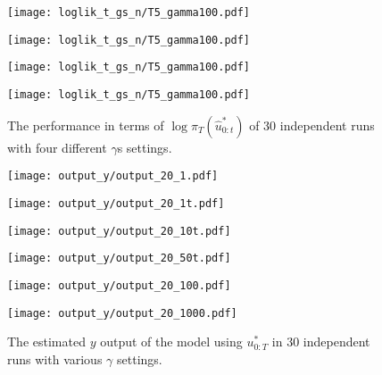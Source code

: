 \begin{figure}[!htbp]
    \centering
    \begin{minipage}{.5\textwidth}
        \centering
        \texttt{[image: loglik\_t\_gs\_n/T5\_gamma100.pdf]}
    \end{minipage}%
    \begin{minipage}{0.5\textwidth}
        \centering
        \texttt{[image: loglik\_t\_gs\_n/T5\_gamma100.pdf]}
    \end{minipage}
    \begin{minipage}{0.5\textwidth}
        \centering
        \texttt{[image: loglik\_t\_gs\_n/T5\_gamma100.pdf]}
    \end{minipage}%
    \begin{minipage}{0.5\textwidth}
        \centering
        \texttt{[image: loglik\_t\_gs\_n/T5\_gamma100.pdf]}
    \end{minipage}
    \caption{The performance in terms of $\log\pi_T(\hat{u}^*_{0:t})$ of 30 independent runs with four different $\gamma$s settings.}
    \label{fig:log}
\end{figure}

\begin{figure}[!htbp]
    \centering
    \begin{minipage}{.5\textwidth}
        \centering
        \texttt{[image: output\_y/output\_20\_1.pdf]}
        \caption*{$\gamma=1$}
    \end{minipage}%
    \begin{minipage}{0.5\textwidth}
        \centering
        \texttt{[image: output\_y/output\_20\_1t.pdf]}
        \caption*{$\gamma=1t$}
    \end{minipage}
    \begin{minipage}{0.5\textwidth}
        \centering
        \texttt{[image: output\_y/output\_20\_10t.pdf]}
        \caption*{$\gamma=10t$}
    \end{minipage}%
    \begin{minipage}{0.5\textwidth}
        \centering
        \texttt{[image: output\_y/output\_20\_50t.pdf]}
        \caption*{$\gamma=50t$}
    \end{minipage}
    \begin{minipage}{0.5\textwidth}
        \centering
        \texttt{[image: output\_y/output\_20\_100.pdf]}
        \caption*{$\gamma=100$}
    \end{minipage}%
    \begin{minipage}{0.5\textwidth}
        \centering
        \texttt{[image: output\_y/output\_20\_1000.pdf]}
        \caption*{$\gamma=1000$}
    \end{minipage}
    \caption{The estimated $y$ output of the model using $u^*_{0:T}$ in 30 independent runs with various $\gamma$ settings.}
    \label{fig:estimatedy}
\end{figure}

